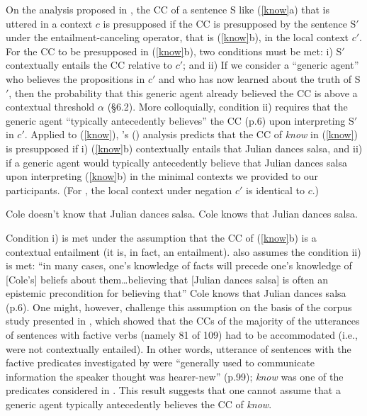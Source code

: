 \documentclass[11pt,fleqn]{article}
\newcommand{\6}{\mbox{$[\hspace*{-.6mm}[$}}
\newcommand{\9}{\mbox{$]\hspace*{-.6mm}]$}}
\newcommand{\citetpos}[1]{\citeauthor{#1}'s (\citeyear{#1})}
\begin{document}
On the analysis proposed in \cite{schlenker2021}, the CC of a sentence S like (\ref{know}a) that is uttered in a context $c$ is presupposed if the CC is presupposed by the sentence S$'$ under the entailment-canceling operator, that is (\ref{know}b), in the local context $c'$. For the CC to be presupposed in (\ref{know}b), two conditions must be met: i) S$'$ contextually entails the CC relative to $c'$; and ii) If we consider a ``generic agent'' who believes the propositions in $c'$ and who has now learned about the truth of S$'$, then the probability that this generic agent already believed the CC is above a contextual threshold $\alpha$ (\S6.2). More colloquially, condition ii) requires that the generic agent ``typically antecedently believes'' the CC (p.6) upon interpreting S$'$ in $c'$. Applied to (\ref{know}), \citetpos{schlenker2021} analysis predicts that the CC of \emph{know} in (\ref{know})  is presupposed if i) (\ref{know}b) contextually entails that Julian dances salsa, and ii) if a generic agent would typically antecedently believe that Julian dances salsa upon interpreting (\ref{know}b) in the minimal contexts we provided to our participants. (For \citealt{schlenker2021}, the local context under negation $c'$ is identical to $c$.)

\begin{exe}
\ex\label{know} 
\begin{xlist}
\ex Cole doesn't know that Julian dances salsa.
\ex Cole knows that Julian dances salsa.
\end{xlist}
\end{exe}

Condition i) is met under the assumption that the CC of (\ref{know}b) is a contextual entailment (it is, in fact, an entailment). \cite{schlenker2021} also assumes the condition ii) is met: ``in many cases, one's knowledge of facts will precede one's knowledge of [Cole's] beliefs about them\ldots believing that [Julian dances salsa] is often an epistemic precondition for believing that'' Cole knows that Julian dances salsa (p.6). One might, however, challenge this assumption on the basis of the corpus study presented in \cite{spenader02}, which showed that the CCs of the majority of the utterances of sentences with factive verbs (namely 81 of 109) had to be accommodated (i.e., were not contextually entailed). In other words, utterance of sentences with the factive predicates investigated by \cite{spenader02} were ``generally used to communicate information the speaker thought was hearer-new'' (p.99); {\em know} was one of the predicates considered in \cite{spenader02}. This result suggests that one cannot assume that a generic agent typically antecedently believes the CC of {\em know}.
\end{document}
